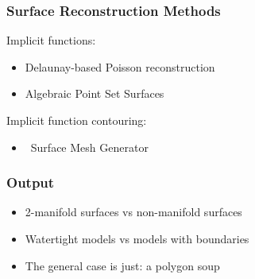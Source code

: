 \subsubsection{Surface Reconstruction Methods}

Implicit functions:

\begin{itemize}
\item Delaunay-based Poisson reconstruction \cite{Kazhdan06}
\item Algebraic Point Set Surfaces \cite{Guennebaud07}
\end{itemize}

Implicit function contouring:

\begin{itemize}
\item \cgal\ Surface Mesh Generator~\cite{cgal:ry-gsddrm-06,cgal:bo-pgsms-05}
\end{itemize}


\subsubsection{Output}

\begin{itemize}
\item 2-manifold surfaces vs non-manifold surfaces
\item Watertight models vs models with boundaries
\item The general case is just: a polygon soup
\end{itemize}


